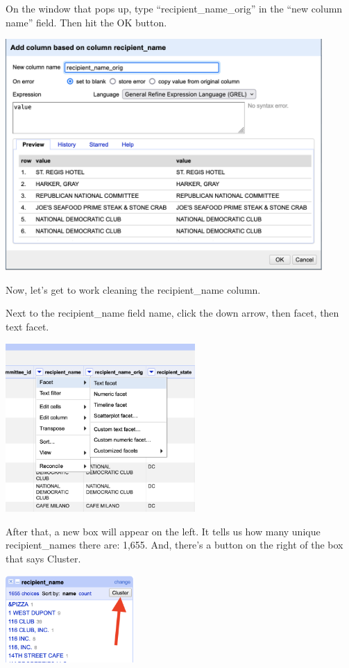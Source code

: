 \documentclass[
  letterpaper,
  DIV=11,
  numbers=noendperiod]{scrreprt}
\begin{document}
On the window that pops up, type ``recipient\_name\_orig'' in the ``new
column name'' field. Then hit the OK button.

\includegraphics[width=4.75in,height=\textheight]{./images/open2b.png}

Now, let's get to work cleaning the recipient\_name column.

Next to the recipient\_name field name, click the down arrow, then
facet, then text facet.

\includegraphics[width=2.84in,height=\textheight]{./images/open3.png}

After that, a new box will appear on the left. It tells us how many
unique recipient\_names there are: 1,655. And, there's a button on the
right of the box that says Cluster.

\includegraphics[width=1.93in,height=\textheight]{./images/open4.png}
\end{document}
